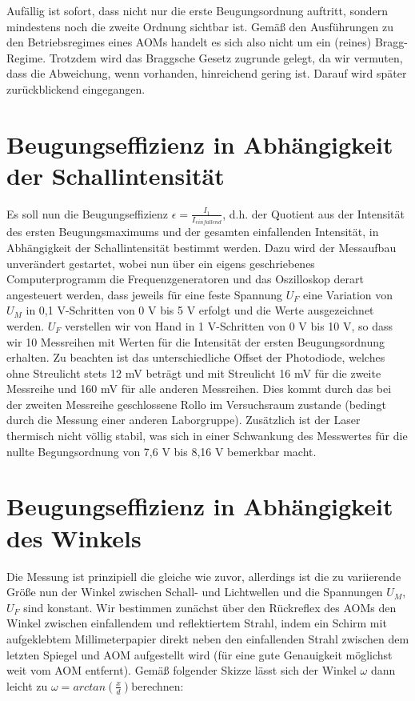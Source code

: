 \documentclass[bigchapter,colorback,accentcolor=tud4b,linedtoc,11pt]{tudreport}
\begin{document}
Aufällig ist sofort, dass nicht nur die erste Beugungsordnung auftritt, sondern mindestens noch die zweite Ordnung sichtbar ist. Gemäß den Ausführungen zu den Betriebsregimes eines AOMs handelt es sich also nicht um ein (reines) Bragg-Regime. Trotzdem wird das Braggsche Gesetz zugrunde gelegt, da wir vermuten, dass die Abweichung, wenn vorhanden, hinreichend gering ist. Darauf wird später zurückblickend eingegangen.

\section{Beugungseffizienz in Abhängigkeit der Schallintensität}

Es soll nun die Beugungseffizienz $\epsilon = \frac{I_1}{I_{einfallend}}$, d.h. der Quotient aus der Intensität des ersten Beugungsmaximums und der gesamten einfallenden Intensität, in Abhängigkeit der Schallintensität bestimmt werden. Dazu wird der Messaufbau unverändert gestartet, wobei nun über ein eigens geschriebenes Computerprogramm die Frequenzgeneratoren und das Oszilloskop derart angesteuert werden, dass jeweils für eine feste Spannung $U_F$ eine Variation von $U_M$ in 0,1 V-Schritten von 0 V bis 5 V erfolgt und die Werte ausgezeichnet werden. $U_F$ verstellen wir von Hand in 1 V-Schritten von 0 V bis 10 V, so dass wir 10 Messreihen mit Werten für die Intensität der ersten Beugungsordnung erhalten. Zu beachten ist das unterschiedliche Offset der Photodiode, welches ohne Streulicht stets 12 mV beträgt und mit Streulicht 16 mV für die zweite Messreihe und 160 mV für alle anderen Messreihen. Dies kommt durch das bei der zweiten Messreihe geschlossene Rollo im Versuchsraum zustande (bedingt durch die Messung einer anderen Laborgruppe). Zusätzlich ist der Laser thermisch nicht völlig stabil, was sich in einer Schwankung des Messwertes für die nullte Begungsordnung von 7,6 V bis 8,16 V bemerkbar macht.

\section{Beugungseffizienz in Abhängigkeit des Winkels}

Die Messung ist prinzipiell die gleiche wie zuvor, allerdings ist die zu variierende Größe nun der Winkel zwischen Schall- und Lichtwellen und die Spannungen $U_M$, $U_F$ sind konstant. Wir bestimmen zunächst über den Rückreflex des AOMs den Winkel zwischen einfallendem und reflektiertem Strahl, indem ein Schirm mit aufgeklebtem Millimeterpapier direkt neben den einfallenden Strahl zwischen dem letzten Spiegel und AOM aufgestellt wird (für eine gute Genauigkeit möglichst weit vom AOM entfernt). Gemäß folgender Skizze lässt sich der Winkel $\omega$ dann leicht zu $\omega = arc tan (\frac{x}{d})$berechnen: 
\end{document}
